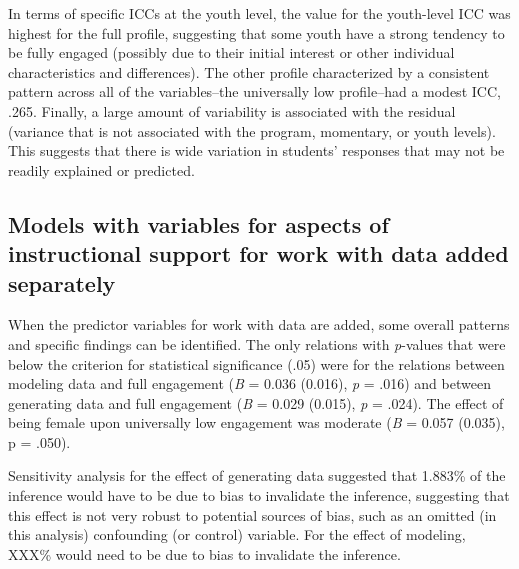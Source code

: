 \documentclass[]{msu-thesis}
\theoremstyle{definition}
\theoremstyle{definition}
\theoremstyle{definition}
\theoremstyle{remark}
\begin{document}
In terms of specific ICCs at the youth level, the value for the
youth-level ICC was highest for the full profile, suggesting that some
youth have a strong tendency to be fully engaged (possibly due to their
initial interest or other individual characteristics and differences).
The other profile characterized by a consistent pattern across all of
the variables--the universally low profile--had a modest ICC, .265.
Finally, a large amount of variability is associated with the residual
(variance that is not associated with the program, momentary, or youth
levels). This suggests that there is wide variation in students'
responses that may not be readily explained or predicted.

\subsection{Models with variables for aspects of instructional support
for work with data added
separately}\label{models-with-variables-for-aspects-of-instructional-support-for-work-with-data-added-separately}

When the predictor variables for work with data are added, some overall
patterns and specific findings can be identified. The only relations
with \emph{p}-values that were below the criterion for statistical
significance (.05) were for the relations between modeling data and full
engagement (\emph{B} = 0.036 (0.016), \emph{p} = .016) and between
generating data and full engagement (\emph{B} = 0.029 (0.015), \emph{p}
= .024). The effect of being female upon universally low engagement was
moderate (\emph{B} = 0.057 (0.035), p = .050).

Sensitivity analysis for the effect of generating data suggested that
1.883\% of the inference would have to be due to bias to invalidate the
inference, suggesting that this effect is not very robust to potential
sources of bias, such as an omitted (in this analysis) confounding (or
control) variable. For the effect of modeling, XXX\% would need to be
due to bias to invalidate the inference.
\end{document}
